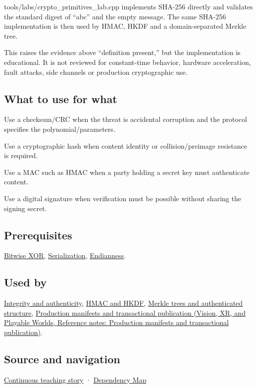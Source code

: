 tools/labs/crypto\_primitives\_lab.cpp implements SHA-256 directly and validates the standard digest of ``abc'' and the empty message. The same SHA-256 implementation is then used by HMAC, HKDF and a domain-separated Merkle tree.

This raises the evidence above ``definition present,'' but the implementation is educational. It is not reviewed for constant-time behavior, hardware acceleration, fault attacks, side channels or production cryptographic use.

\subsection{What to use for what}\label{appendix-ed338677de0a-what-to-use-for-what}

Use a checksum/CRC when the threat is accidental corruption and the protocol specifies the polynomial/parameters.

Use a cryptographic hash when content identity or collision/preimage resistance is required.

Use a MAC such as HMAC when a party holding a secret key must authenticate content.

Use a digital signature when verification must be possible without sharing the signing secret.

\subsection{Prerequisites}\label{appendix-ed338677de0a-prerequisites}

\hyperref[appendix-d49161831368]{Bitwise XOR}, \hyperref[appendix-91d09ebed979]{Serialization}, \hyperref[appendix-bc07c3d25b18]{Endianness}.

\subsection{Used by}\label{appendix-ed338677de0a-used-by}

\hyperref[appendix-cbe594d1ab0a]{Integrity and authenticity}, \hyperref[appendix-50af792c9da7]{HMAC and HKDF}, \hyperref[appendix-098192f8d46d]{Merkle trees and authenticated structure}, \href{../07-Vision-XR-and-Playable-Worlds/main.pdf\#nameddest=appendix-91eaa3cbdbc3}{Production manifests and transactional publication (Vision, XR, and Playable Worlds, Reference notes: Production manifests and transactional publication)}.

\subsection{Source and navigation}\label{appendix-ed338677de0a-source-and-navigation}

\hyperref[01-foundations-i-ch002-bytes-become-a-durable-agreement]{Continuous teaching story} · \hyperref[appendix-4ad47bdd269a]{Dependency Map}
